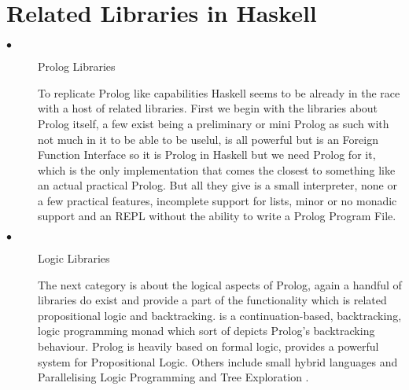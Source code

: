 \documentclass[thesis-solanki.tex]{subfiles}
\begin{document}
\begin{description}
\end{description}


\section{Related Libraries in Haskell}
\begin{description}
\item[$\bullet$]Prolog Libraries

  To replicate Prolog like capabilities Haskell seems to be already in the race with a host of related libraries.
  First we begin with the libraries about Prolog itself, a few exist \cite{nanoprolog-lib} being a preliminary or
  mini Prolog as such with not much in it to be able to be uselul, \cite{hswip-lib} is all
  powerful but is an Foreign Function Interface so it is Prolog in Haskell but we need Prolog
  for it, \cite{prolog-lib} which is the only implementation that comes the closest to something like an actual
  practical Prolog.
  But all they give is a small interpreter, none or a few practical features, incomplete support for lists, minor
  or no monadic support and an REPL without the ability to write a Prolog Program File.

\begin{comment}
\begin{enumerate}
	\item Nano Prolog
	\item Prolog
	\item cspm-To-Prolog
	\item prolog-graph and prolog-graph-lib
	\item hswip,
	\\* \url{https://groups.google.com/forum/#!topic/haskell-cafe/3vmCuw7NlWE}
\end{enumerate}
\end{comment}

\item[$\bullet$]Logic Libraries

The next category is about the logical aspects of Prolog, again a handful of libraries do exist and provide a part
of the functionality which is related propositional logic and backtracking. \cite{logict-lib} is a
continuation-based, backtracking, logic programming monad which sort of depicts Prolog's backtracking
behaviour. Prolog is heavily based on formal logic, \cite{proplogic-lib} provides a powerful system for
Propositional Logic. Others include small hybrid languages \cite{cflp-lib} and Parallelising Logic Programming
and Tree Exploration \cite{logic-grows-on-trees-lib}.


\end{description}
\end{document}
